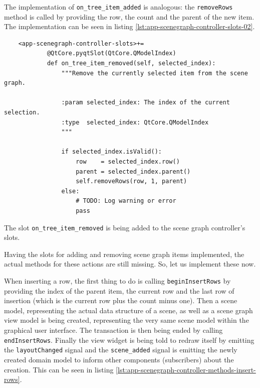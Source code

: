 \documentclass[10pt, openright, notitlepage]{scrreprt}
\begin{document}
The implementation of \texttt{on\_tree\_item\_added} is analogous: the
\texttt{removeRows} method is called by providing the row, the count and
the parent of the new item. The implementation can be seen in listing
\ref{lst:app-scenegraph-controller-slots-02}.

\begin{listing}[H]
\begin{verbatim}
    <app-scenegraph-controller-slots>+=
            @QtCore.pyqtSlot(QtCore.QModelIndex)
            def on_tree_item_removed(self, selected_index):
                """Remove the currently selected item from the scene graph.
            
                :param selected_index: The index of the current selection.
                :type  selected_index: QtCore.QModelIndex
                """
            
                if selected_index.isValid():
                    row    = selected_index.row()
                    parent = selected_index.parent()
                    self.removeRows(row, 1, parent)
                else:
                    # TODO: Log warning or error
                    pass
\end{verbatim}
\caption{\label{lst:app-scenegraph-controller-slots-02}
The slot \texttt{on\_tree\_item\_removed} is being added to the scene graph controller's slots.}
\end{listing}

Having the slots for adding and removing scene graph items implemented, the
actual methods for these actions are still missing. So, let us implement these
now.

When inserting a row, the first thing to do is calling
\texttt{beginInsertRows} by providing the index of the parent item, the
current row and the last row of insertion (which is the current row plus the
count minus one). Then a scene model, representing the actual data structure of
a scene, as well as a scene graph view model is being created, representing the
very same scene model within the graphical user interface. The transaction is
then being ended by calling \texttt{endInsertRows}. Finally the view widget
is being told to redraw itself by emitting the \texttt{layoutChanged} signal
and the \texttt{scene\_added} signal is emitting the newly created domain
model to inform other components (subscribers) about the creation. This can be
seen in listing \ref{lst:app-scenegraph-controller-methods-insert-rows}.
\end{document}
